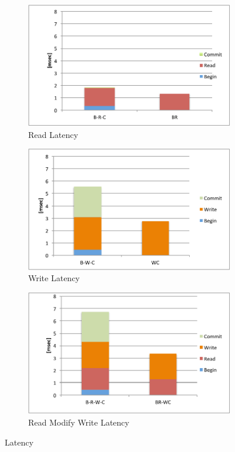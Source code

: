 
\begin{figure}[!htb]
  \centering
  \begin{subfigure}[t]{0.3\textwidth}
	\includegraphics[width=\textwidth]{figs/read_latency.pdf}
	\caption[]{Read Latency}
  \end{subfigure}
  \begin{subfigure}[t]{0.3\textwidth}
	\includegraphics[width=\textwidth]{figs/write_latency.pdf}
	\caption[]{Write Latency}
  \end{subfigure}	
  \begin{subfigure}[t]{0.3\textwidth}
	\includegraphics[width=\textwidth]{figs/rmw_latency.pdf}
	\caption[]{Read Modify Write Latency}
  \end{subfigure}			
  \caption{Latency}\label{fig:latency}
  \label{fig:latency}
\end{figure}


